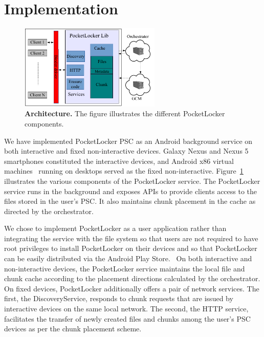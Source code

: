 
\section{Implementation}
\label{sec-implementation}

\begin{figure}

\vspace*{-0.6in}

\includegraphics[width=0.6\textwidth]{./figures/implementation.pdf}

\vspace*{-0.1in}

\caption{\small \textbf{Architecture.} The figure illustrates the different
  PocketLocker components.}

\label{fig-implementation}

\vspace*{-0.2in}

\end{figure}

We have implemented PocketLocker PSC as an Android background service on both
interactive and fixed non-interactive devices. Galaxy Nexus and Nexus 5
smartphones constituted the interactive devices, and Android x86 virtual
machines~\cite{androidx86} running on desktops served as the fixed
non-interactive. Figure~\ref{fig-implementation}
illustrates the various components of the PocketLocker service. 
The PocketLocker service runs in the background and exposes APIs to provide
clients access to the files stored in the user's PSC. It also maintains chunk
placement in the cache as directed by the orchestrator. 

We chose to implement PocketLocker as a user application rather than
integrating the service with the file system so that users are not required
to have root privileges to install PocketLocker on their devices and so that
PocketLocker can be easily distributed via the Android Play Store.~\cite{playstore} On both
interactive and non-interactive devices, the PocketLocker service maintains
the local file and chunk cache according to the placement directions
calculated by the orchestrator. On fixed devices, PocketLocker additionally
offers a pair of network services.  The first, the DiscoveryService, responds
to chunk requests that are issued by interactive devices on the same local
network. The second, the HTTP service, facilitates the transfer of newly
created files and chunks among the user's PSC devices as per the chunk
placement scheme.


